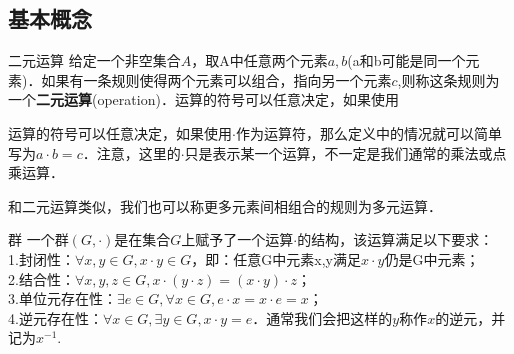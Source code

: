 
\subsection{基本概念}

\begin{definition}{二元运算}
给定一个非空集合$A$，取A中任意两个元素$a, b$(a和b可能是同一个元素)．如果有一条规则使得两个元素可以组合，指向另一个元素$c$,则称这条规则为一个\textbf{二元运算}(operation)．运算的符号可以任意决定，如果使用
\end{definition}

运算的符号可以任意决定，如果使用$\cdot$作为运算符，那么定义中的情况就可以简单写为$a\cdot b=c$．注意，这里的$\cdot$只是表示某一个运算，不一定是我们通常的乘法或点乘运算．

和二元运算类似，我们也可以称更多元素间相组合的规则为多元运算．

\begin{definition}{群}
一个群$(G, \cdot)$是在集合$G$上赋予了一个运算$\cdot$的结构，该运算满足以下要求：\\


1.封闭性：$\forall x, y\in G, x\cdot y\in G$，即：任意G中元素x,y满足$x\cdot y$仍是G中元素；\\

2.结合性：$\forall x, y, z\in G, x\cdot(y\cdot z)=(x\cdot y)\cdot z$；\\

3.单位元存在性：$\exists e\in G, \forall x\in G, e\cdot x=x\cdot e=x$；\\

4.逆元存在性：$\forall x\in G, \exists y\in G, x\cdot y=e$．通常我们会把这样的$y$称作$x$的逆元，并记为$x^{-1}$. 

\end{definition}